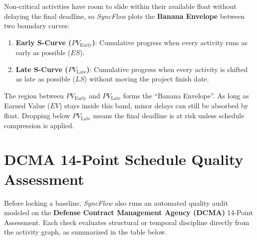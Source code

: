 \vspace{3mm}

Non-critical activities have room to slide within their available float without delaying the final deadline, so \textit{SyncFlow} plots the \textbf{Banana Envelope} between two boundary curves:
\begin{enumerate}[leftmargin=*,itemsep=1pt,topsep=1pt]
    \item \textbf{Early S-Curve ($PV_{\text{Early}}$)}: Cumulative progress when every activity runs as early as possible ($ES$).
    \item \textbf{Late S-Curve ($PV_{\text{Late}}$)}: Cumulative progress when every activity is shifted as late as possible ($LS$) without moving the project finish date.
\end{enumerate}
The region between $PV_{\text{Early}}$ and $PV_{\text{Late}}$ forms the ``Banana Envelope''. As long as Earned Value ($EV$) stays inside this band, minor delays can still be absorbed by float. Dropping below $PV_{\text{Late}}$ means the final deadline is at risk unless schedule compression is applied.

\vspace{4mm}

\section{DCMA 14-Point Schedule Quality Assessment}
Before locking a baseline, \textit{SyncFlow} also runs an automated quality audit modeled on the \textbf{Defense Contract Management Agency (DCMA)} 14-Point Assessment. Each check evaluates structural or temporal discipline directly from the activity graph, as summarized in the table below.

